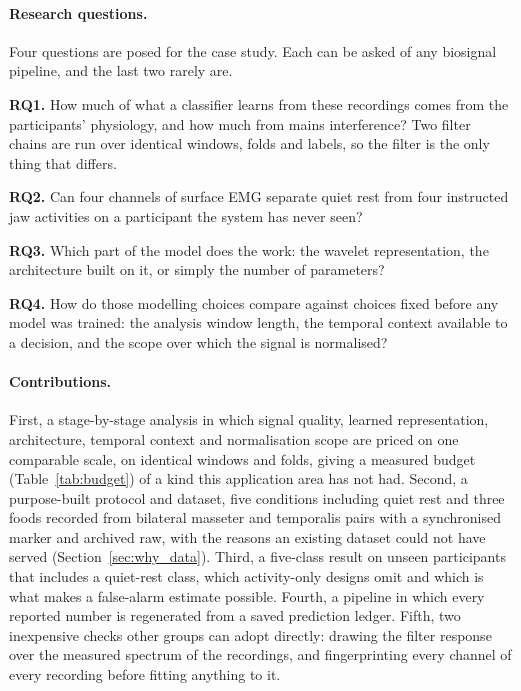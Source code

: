 \documentclass[pdflatex,sn-nature,iicol]{sn-jnl}
\begin{document}
\paragraph{Research questions.} Four questions are posed for the case study. Each can be asked of any biosignal pipeline, and the last two rarely are.

\textbf{RQ1.} How much of what a classifier learns from these recordings comes from the participants' physiology, and how much from mains interference? Two filter chains are run over identical windows, folds and labels, so the filter is the only thing that differs.

\textbf{RQ2.} Can four channels of surface EMG separate quiet rest from four instructed jaw activities on a participant the system has never seen?

\textbf{RQ3.} Which part of the model does the work: the wavelet representation, the architecture built on it, or simply the number of parameters?

\textbf{RQ4.} How do those modelling choices compare against choices fixed before any model was trained: the analysis window length, the temporal context available to a decision, and the scope over which the signal is normalised?

\paragraph{Contributions.} First, a stage-by-stage analysis in which signal quality, learned representation, architecture, temporal context and normalisation scope are priced on one comparable scale, on identical windows and folds, giving a measured budget (Table~\ref{tab:budget}) of a kind this application area has not had. Second, a purpose-built protocol and dataset, five conditions including quiet rest and three foods recorded from bilateral masseter and temporalis pairs with a synchronised marker and archived raw, with the reasons an existing dataset could not have served (Section~\ref{sec:why_data}). Third, a five-class result on unseen participants that includes a quiet-rest class, which activity-only designs omit and which is what makes a false-alarm estimate possible. Fourth, a pipeline in which every reported number is regenerated from a saved prediction ledger. Fifth, two inexpensive checks other groups can adopt directly: drawing the filter response over the measured spectrum of the recordings, and fingerprinting every channel of every recording before fitting anything to it.
\end{document}

